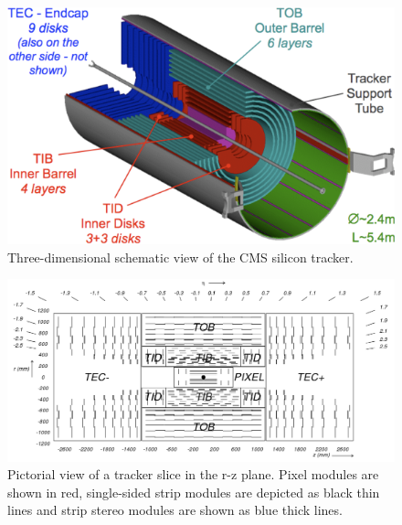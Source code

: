 \begin{figure}
\centering
\includegraphics[scale= 0.5]{../Cap2/trk}
\caption{Three-dimensional schematic view of the CMS silicon tracker.}
\label{trk}
\end{figure}

\begin{figure}
\centering
\includegraphics[scale= 0.3]{../Cap2/fig_cmstracker}
\caption{Pictorial view of a tracker slice in the r-z plane. Pixel modules are shown in
red, single-sided strip modules are depicted as black thin lines and strip stereo modules are
shown as blue thick lines.}
\label{fig_cmstracker}
\end{figure}

